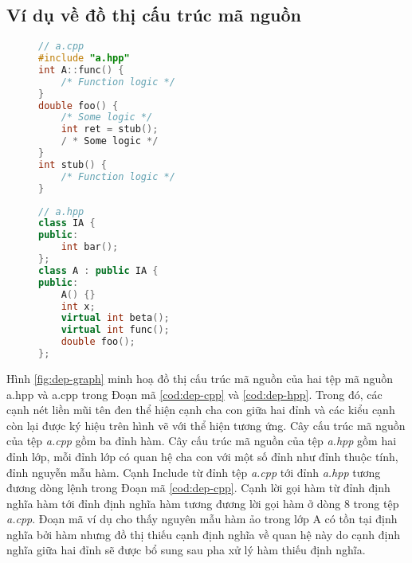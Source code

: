 \subsection*{Ví dụ về đồ thị cấu trúc mã nguồn}
\begin{figure}[ht]
    \begin{minipage}[t]{0.5\linewidth}
    \begin{lstlisting}[language=C++, caption={Mã nguồn tệp \textit{a.cpp} minh họa đồ thị cấu trúc mã nguồn.}, label={cod:dep-cpp}, captionpos=b]
// a.cpp
#include "a.hpp"
int A::func() {
    /* Function logic */
}
double foo() {
    /* Some logic */
    int ret = stub();
    / * Some logic */
}
int stub() {
    /* Function logic */
}
    \end{lstlisting}
    \end{minipage}
    \begin{minipage}[t]{0.5\linewidth}
    \begin{lstlisting}[language=C++, caption={Mã nguồn tệp \textit{a.hpp} minh họa đồ thị cấu trúc mã nguồn.}, label={cod:dep-hpp}, captionpos=b]
// a.hpp
class IA {
public: 
    int bar();
};
class A : public IA {
public:
    A() {}
    int x;
    virtual int beta();
    virtual int func();
    double foo();
}; 
    \end{lstlisting}
\end{minipage}
\end{figure}

Hình \ref{fig:dep-graph} minh hoạ đồ thị cấu trúc mã nguồn của hai tệp mã nguồn a.hpp và a.cpp trong Đoạn mã \ref{cod:dep-cpp} và \ref{cod:dep-hpp}. Trong đó, các cạnh nét liền mũi tên đen thể hiện cạnh cha con giữa hai đỉnh và các kiểu cạnh còn lại được ký hiệu trên hình vẽ với thể hiện tương ứng. Cây cấu trúc mã nguồn của tệp \textit{a.cpp} gồm ba đỉnh hàm. Cây cấu trúc mã nguồn của tệp \textit{a.hpp} gồm hai đỉnh lớp, mỗi đỉnh lớp có quan hệ cha con với một số đỉnh như đỉnh thuộc tính, đỉnh nguyễn mẫu hàm. Cạnh Include từ đỉnh tệp \textit{a.cpp} tới đỉnh \textit{a.hpp} tương đương dòng lệnh  trong Đoạn mã \ref{cod:dep-cpp}. Cạnh lời gọi hàm từ đỉnh định nghĩa hàm  tới đỉnh định nghĩa hàm  tương đương lời gọi hàm ở dòng 8 trong tệp \textit{a.cpp}. Đoạn mã ví dụ cho thấy nguyên mẫu hàm ảo  trong lớp A có tồn tại định nghĩa bởi hàm  nhưng đồ thị thiếu cạnh định nghĩa về quan hệ này do cạnh định nghĩa giữa hai đỉnh sẽ được bổ sung sau pha xử lý hàm thiếu định nghĩa.  
 
